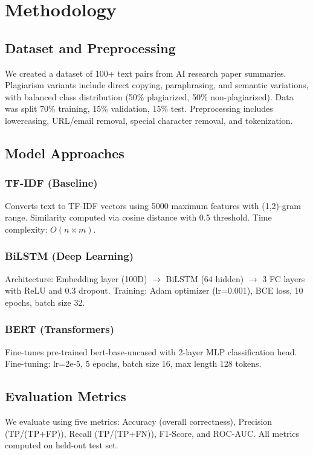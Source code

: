 \section{Methodology} \label{sec:methodology}

\subsection{Dataset and Preprocessing}

We created a dataset of 100+ text pairs from AI research paper summaries. Plagiarism variants include direct copying, paraphrasing, and semantic variations, with balanced class distribution (50\% plagiarized, 50\% non-plagiarized). Data was split 70\% training, 15\% validation, 15\% test. Preprocessing includes lowercasing, URL/email removal, special character removal, and tokenization.

\subsection{Model Approaches}

\subsubsection{TF-IDF (Baseline)}
Converts text to TF-IDF vectors using 5000 maximum features with (1,2)-gram range. Similarity computed via cosine distance with 0.5 threshold. Time complexity: $O(n \times m)$.

\subsubsection{BiLSTM (Deep Learning)}
Architecture: Embedding layer (100D) $\rightarrow$ BiLSTM (64 hidden) $\rightarrow$ 3 FC layers with ReLU and 0.3 dropout. Training: Adam optimizer (lr=0.001), BCE loss, 10 epochs, batch size 32.

\subsubsection{BERT (Transformers)}
Fine-tunes pre-trained bert-base-uncased with 2-layer MLP classification head. Fine-tuning: lr=2e-5, 5 epochs, batch size 16, max length 128 tokens.

\subsection{Evaluation Metrics}

We evaluate using five metrics: Accuracy (overall correctness), Precision (TP/(TP+FP)), Recall (TP/(TP+FN)), F1-Score, and ROC-AUC. All metrics computed on held-out test set.

